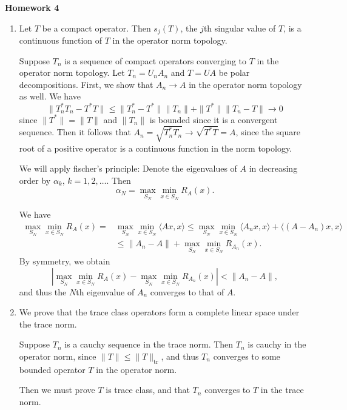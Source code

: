 \documentclass[11pt, reqno]{article}
\theoremstyle{plain}
\theoremstyle{definition}
\theoremstyle{remark}
\begin{document}
\topmargin=-40pt
\renewcommand{\headrulewidth}{1pt}
\renewcommand{\headsep}{20pt}
\thispagestyle{fancy}

{\Huge \bfseries \noindent Homework 4}
\begin{enumerate}
    \item[1.] Let $T$ be a compact operator. Then $s_j(T)$, the $j$th singular value of $T$,
    is a continuous function of $T$ in the operator norm topology. 

    Suppose $T_n$ is a sequence of compact operators converging to $T$ in the operator norm topology.
    Let $T_n = U_n A_n$ and $T = UA$ be polar decompositions. First, we show that $A_n \to A$ 
    in the operator norm topology as well. We have 
    \[
        \|T_n^* T_n - T^* T\| \leq \|T_n^* - T^*\|\|T_n\| + \|T^*\|\|T_n - T\| \to 0
    \]
    since $\|T^*\| = \|T\|$ and $\|T_n\|$ is bounded since it is a convergent sequence. Then 
    it follows that $A_n = \sqrt{T_n^* T_n} \to \sqrt{T^* T} = A$, since the square root of a positive operator
    is a continuous function in the norm topology. 

    We will apply fischer's principle: Denote the eigenvalues of $A$ in decreasing order 
    by $\alpha_k$, $k = 1, 2, \dots$. Then 
    \[
        \alpha_N = \max_{S_N} \min_{x \in S_N} R_A(x).
    \]

    We have
    \begin{align*}
            \max_{S_N} \min_{x \in S_N} R_A(x) = &\max_{S_N} \min_{x \in S_N} \langle Ax, x\rangle 
            \leq \max_{S_N} \min_{x \in S_N} \langle A_n x, x\rangle + \langle (A - A_n)x, x \rangle \\
            &\leq \|A_n - A\| + \max_{S_N} \min_{x \in S_N} R_{A_n}(x).
    \end{align*}
    By symmetry, we obtain
    \[
        |\max_{S_N} \min_{x \in S_N} R_A(x) - \max_{S_N} \min_{x \in S_N} R_{A_n}(x)| < \|A_n - A\|,
    \]
    and thus the $N$th eigenvalue of $A_n$ converges to that of $A$.

    \item[4.] We prove that the trace class operators form a complete linear space under the trace norm.
    
    Suppose $T_n$ is a cauchy sequence in the trace norm. Then $T_n$ is cauchy in the operator norm,
    since $\|T\| \leq \|T\|_{\text{tr}}$, and thus $T_n$ converges to some bounded operator $T$ 
    in the operator norm. 

    Then we must prove $T$ is trace class, and that $T_n$ converges to $T$ in the trace norm. 


\end{enumerate}
\end{document}
